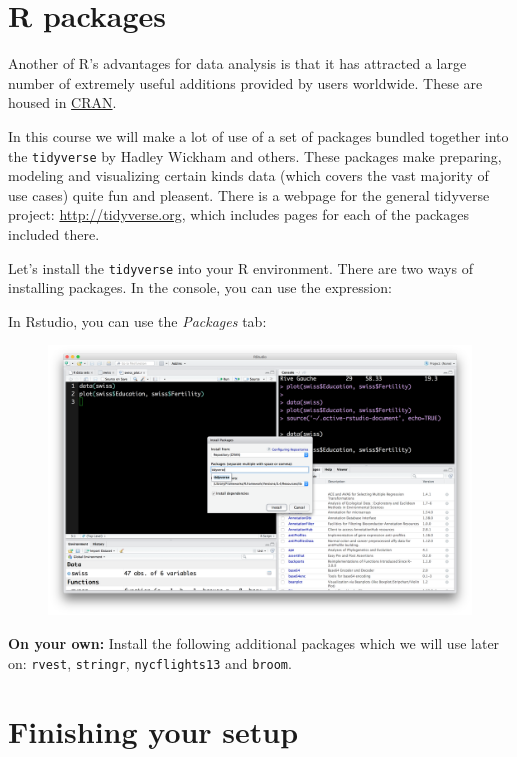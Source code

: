 \documentclass[12pt,]{book}
\theoremstyle{definition}
\theoremstyle{definition}
\theoremstyle{remark}
\begin{document}
\section{R packages}\label{r-packages}

Another of R's advantages for data analysis is that it has attracted a
large number of extremely useful additions provided by users worldwide.
These are housed in
\href{https://cran.r-project.org/web/packages/index.html}{CRAN}.

In this course we will make a lot of use of a set of packages bundled
together into the \texttt{tidyverse} by Hadley Wickham and others. These
packages make preparing, modeling and visualizing certain kinds data
(which covers the vast majority of use cases) quite fun and pleasent.
There is a webpage for the general tidyverse project:
\url{http://tidyverse.org}, which includes pages for each of the
packages included there.

Let's install the \texttt{tidyverse} into your R environment. There are
two ways of installing packages. In the console, you can use the
expression:

In Rstudio, you can use the \emph{Packages} tab:

\begin{figure}
\centering
\includegraphics{img/rstudio_install_packages.png}
\caption{}
\end{figure}

\textbf{On your own:} Install the following additional packages which we
will use later on: \texttt{rvest}, \texttt{stringr},
\texttt{nycflights13} and \texttt{broom}.

\section{Finishing your setup}\label{finishing-your-setup}
\end{document}
